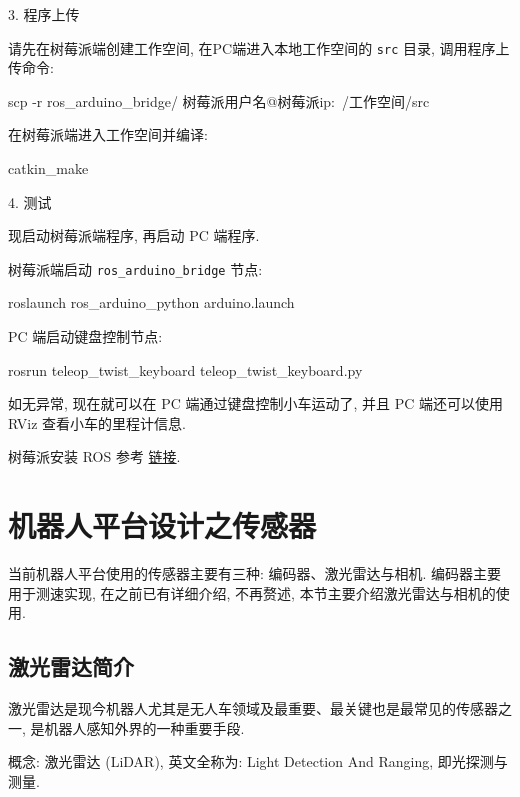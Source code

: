 \documentclass[openany, fontset=windowsold]{ctexbook}
\theoremstyle{kaiti}
\theoremstyle{normal}
\begin{document}
3. 程序上传

请先在树莓派端创建工作空间, 在PC端进入本地工作空间的 \verb|src| 目录, 调用程序上传命令:

\begin{bash}
  scp -r ros_arduino_bridge/ 树莓派用户名@树莓派ip:~/工作空间/src
\end{bash}

在树莓派端进入工作空间并编译:

\begin{bash}
  catkin_make
\end{bash}

4. 测试

现启动树莓派端程序, 再启动 PC 端程序.

树莓派端启动 \verb|ros_arduino_bridge| 节点:

\begin{bash}
  roslaunch ros_arduino_python arduino.launch
\end{bash}

PC 端启动键盘控制节点: 

\begin{bash}
  rosrun teleop_twist_keyboard teleop_twist_keyboard.py
\end{bash}

如无异常, 现在就可以在 PC 端通过键盘控制小车运动了, 并且 PC 端还可以使用 RViz 查看小车的里程计信息.

树莓派安装 ROS 参考 \href{http://www.autolabor.com.cn/book/ROSTutorials/di-8-zhang-gou-jian-lun-shi-cha-fen-ji-qi-ren/87-ji-qi-ren-ping-tai-she-ji-zhi-kong-zhi-xi-tong/872-kong-zhi-xi-tong-shi-xian-shu-mei-pai-an-zhuang-ros.html}{链接}.

\section{机器人平台设计之传感器}

当前机器人平台使用的传感器主要有三种: 编码器、激光雷达与相机. 编码器主要用于测速实现, 在之前已有详细介绍, 不再赘述, 本节主要介绍激光雷达与相机的使用.

\subsection{激光雷达简介}

激光雷达是现今机器人尤其是无人车领域及最重要、最关键也是最常见的传感器之一, 是机器人感知外界的一种重要手段.

概念: 激光雷达 (LiDAR), 英文全称为: Light Detection And Ranging, 即光探测与测量.
\end{document}
